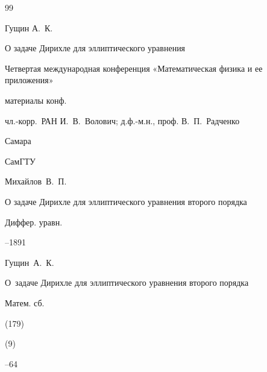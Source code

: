 \begin{thebibliography}{99}




\by Гущин А.~К.

\paper О задаче Дирихле для эллиптического уравнения


\inbook Четвертая международная конференция «Математическая физика и ее приложения»

\bookinfo материалы конф. 

\eds чл.-корр.~РАН И.~В.~Волович; д.ф.-м.н., проф. В.~П.~Радченко

\publaddr Самара

\publ СамГТУ





\by Михайлов~В.~П.

\paper О задаче Дирихле для эллиптического уравнения второго порядка

\jour Диффер. уравн.




--1891





\by Гущин~А.~К.

\paper О~задаче Дирихле для эллиптического уравнения второго порядка

\jour Матем. сб.


(179)

(9)

--64









\end{thebibliography}
